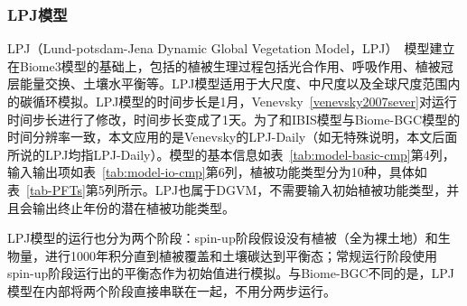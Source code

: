 \subsubsection{LPJ模型}
LPJ（Lund-potsdam-Jena Dynamic Global Vegetation Model，LPJ）~\cite{sitch2003evaluation}模型建立在Biome3模型的基础上，包括的植被生理过程包括光合作用、呼吸作用、植被冠层能量交换、土壤水平衡等。LPJ模型适用于大尺度、中尺度以及全球尺度范围内的碳循环模拟。LPJ模型的时间步长是1月，Venevsky~\ref{venevsky2007sever}对运行时间步长进行了修改，时间步长变成了1天。为了和IBIS模型与Biome-BGC模型的时间分辨率一致，本文应用的是Venevsky的LPJ-Daily（如无特殊说明，本文后面所说的LPJ均指LPJ-Daily）。模型的基本信息如表~\ref{tab:model-basic-cmp}第4列，输入输出项如表~\ref{tab:model-io-cmp}第6列，植被功能类型分为10种，具体如表~\ref{tab-PFTs}第5列所示。LPJ也属于DGVM，不需要输入初始植被功能类型，并且会输出终止年份的潜在植被功能类型。

LPJ模型的运行也分为两个阶段：spin-up阶段假设没有植被（全为裸土地）和生物量，进行1000年积分直到植被覆盖和土壤碳达到平衡态；常规运行阶段使用spin-up阶段运行出的平衡态作为初始值进行模拟。与Biome-BGC不同的是，LPJ模型在内部将两个阶段直接串联在一起，不用分两步运行。

